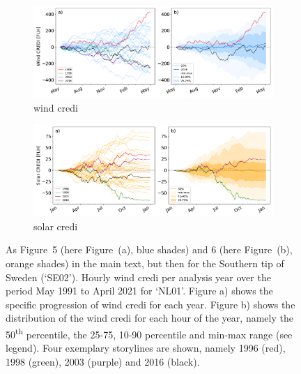 \documentclass[12pt]{iopart}
\newcommand{\ts}[1]{\textsuperscript{#1}}
\newcommand{\sdi}[0]{{\sc solar credi}}
\newcommand{\wdi}[0]{{\sc wind credi}}
\begin{document}
\begin{figure}[hb]
    \centering
    \begin{subfigure}[t]{\linewidth}
        \centering
        \includegraphics[width=\textwidth]{additional_regions/WindCREDI_annual_SE02.pdf}
        \caption{\wdi{}}\vspace*{0.5cm}
    \end{subfigure}
    
    \begin{subfigure}[t]{\linewidth}
        \centering
        \includegraphics[width=\textwidth]{additional_regions/SolarCREDI_annual_SE02.pdf}
        \caption{\sdi{}}\vspace*{0.5cm}
    \end{subfigure}
    \caption{
        As Figure~5 (here Figure~(a), blue shades) and 6 (here Figure~(b), orange shades) in the main text, but then for the Southern tip of Sweden (`SE02').
        Hourly \wdi{} per analysis year over the period May 1991 to April 2021 for `NL01'. 
        Figure a) shows the specific progression of \wdi{} for each year. 
        Figure b) shows the distribution of the \wdi{} for each hour of the year, namely the 50\ts{th} percentile, the 25-75, 10-90 percentile and min-max range (see legend). 
        Four exemplary storylines are shown, namely 1996 (red), 1998 (green), 2003 (purple) and 2016 (black).
    }
    \label{SIfig:analysis_seasonal_wind_other-regions}
\end{figure}
\end{document}
